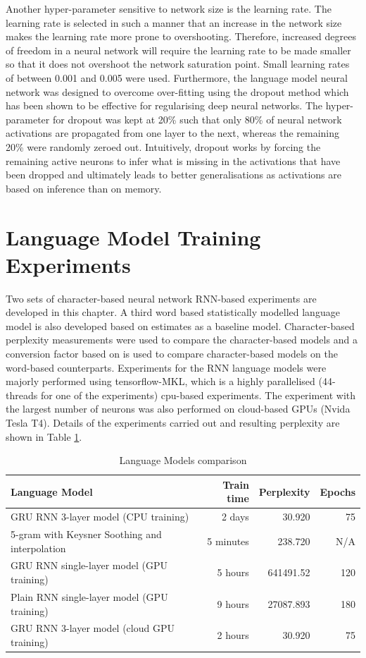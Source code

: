 Another hyper-parameter sensitive to network size is the learning rate.  The learning rate is selected in such a manner that an increase in the network size makes the learning rate more prone to overshooting.  Therefore, increased degrees of freedom in a neural network will require the learning rate to be made smaller so that it does not overshoot the network saturation point.  Small learning rates of between 0.001 and 0.005 were used. Furthermore, the language model neural network was designed to overcome over-fitting using the dropout method \citep{srivastava2014dropout} which has been shown to be effective for regularising deep neural networks.  The hyper-parameter for dropout was kept at 20\% such that only 80\% of neural network activations are propagated from one layer to the next, whereas the remaining 20\% were randomly zeroed out.  Intuitively, dropout works by forcing the remaining active neurons to infer what is missing in the activations that have been dropped and ultimately leads to better generalisations as activations are based on inference than on memory.

\section{Language Model Training Experiments}
Two sets of character-based neural network RNN-based experiments are developed in this chapter.  A third word based statistically modelled language model is also developed based on  \cite{Heafield-estimate} estimates as a baseline model. Character-based perplexity measurements were used to compare the character-based models and a conversion factor based on \citep{hwang2017character} is used to compare character-based models on the word-based counterparts.  Experiments for the RNN language models were majorly performed using tensorflow-MKL, which is a highly parallelised (44-threads for one of the experiments) cpu-based experiments.  The experiment with the largest number of neurons was also performed on cloud-based GPUs (Nvida Tesla T4).  Details of the experiments carried out and resulting perplexity are shown in Table \ref{tab6_1:LMX}.

\begin{table}
  \caption{Language Models comparison}
  \label{tab6_1:LMX}
\begin{tabular}{lrrr}
\toprule
Language Model & Train time & Perplexity & Epochs  \\
\midrule
GRU RNN 3-layer model (CPU training) & ~ 2 days & 30.920 & 75 \\
5-gram with Keysner Soothing and interpolation & 5 minutes & 238.720 & N/A \\
GRU RNN single-layer model (GPU training) & ~ 5 hours & 641491.52 & 120 \\
Plain RNN single-layer model (GPU training) & ~ 9 hours & 27087.893 & 180 \\
GRU RNN 3-layer model (cloud GPU training) & ~ 2 hours & 30.920 & 75 \\
\bottomrule
\end{tabular}
\end{table}

